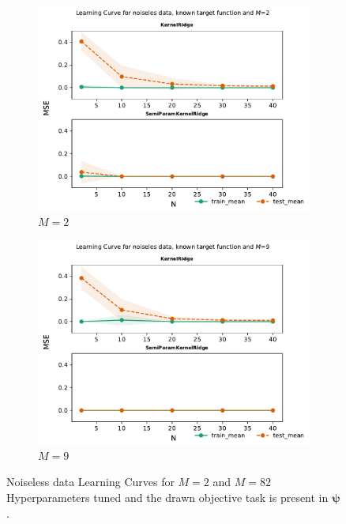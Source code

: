 \documentclass{tran-l}
\theoremstyle{definition}
\theoremstyle{remark}
\numberwithin{equation}{section}
\begin{document}
\begin{figure}[h!]
   \centering
   \begin{subfigure}[b]{0.45\textwidth}
     \centering
     \includegraphics[width=\textwidth]{Figures/knownnoiseless/learningcurve2}
     \caption{$M=2$}
   \end{subfigure}
   \hfill
   \begin{subfigure}[b]{0.45\textwidth}
     \centering
     \includegraphics[width=\textwidth]{Figures/knownnoiseless/learningcurve9}
     \caption{$M=9$}
   \end{subfigure}
   \caption{Noiseless data Learning Curves for $M=2$ and $M=82$ Hyperparameters tuned and the drawn objective task is present in $\boldsymbol{\psi}$. }
\end{figure}
\end{document}
